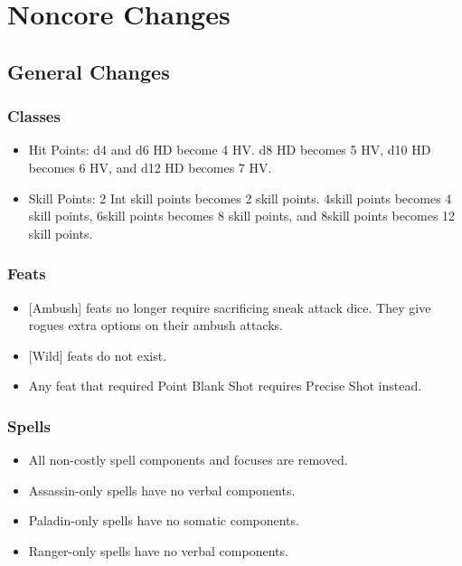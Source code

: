 \chapter{Noncore Changes}

\section{General Changes}

\subsection{Classes}
\begin{itemize}
\item Hit Points: d4 and d6 HD become 4 HV. d8 HD becomes 5 HV, d10 HD becomes 6 HV, and d12 HD becomes 7 HV.
\item Skill Points: 2 \add Int skill points becomes 2 skill points. 4\add skill points becomes 4 skill points, 6\add skill points becomes 8 skill points, and 8\add skill points becomes 12 skill points.
\end{itemize}

\subsection{Feats}
\begin{itemize}
\item {[}Ambush] feats no longer require sacrificing sneak attack dice. They give rogues extra options on their ambush attacks.
\item {[}Wild] feats do not exist.
\item Any feat that required Point Blank Shot requires Precise Shot instead.
\end{itemize}

\subsection{Spells}
\begin{itemize}
\item All non-costly spell components and focuses are removed.
\item Assassin-only spells have no verbal components.
\item Paladin-only spells have no somatic components.
\item Ranger-only spells have no verbal components.
\end{itemize}

